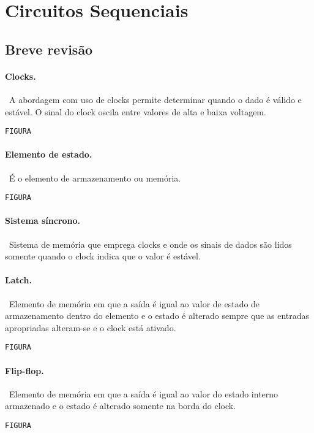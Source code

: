 
\def\myfigure{{\tt\vspace{3cm}\Large FIGURA\vspace{3cm}}}

\section{Circuitos Sequenciais}

\subsection*{Breve revisão}

\paragraph{Clocks.}~A abordagem com uso de clocks permite determinar
quando o dado é válido e estável. O sinal do clock oscila entre
valores de alta e baixa voltagem.


\myfigure

\paragraph{Elemento de estado.}~É o elemento de armazenamento ou
memória.

\myfigure

\paragraph{Sistema síncrono.}~Sistema de memória que emprega clocks e
onde os sinais de dados são lidos somente quando o clock indica que o
valor é estável.

\paragraph{Latch.}~Elemento de memória em que a saída é igual ao valor
de estado de armazenamento dentro do elemento e o estado é alterado
sempre que as entradas apropriadas alteram-se e o clock está ativado.


\myfigure


\paragraph{Flip-flop.}~Elemento de memória em que a saída é igual ao
valor do estado interno armazenado e o estado é alterado somente na
borda do clock.

\myfigure


